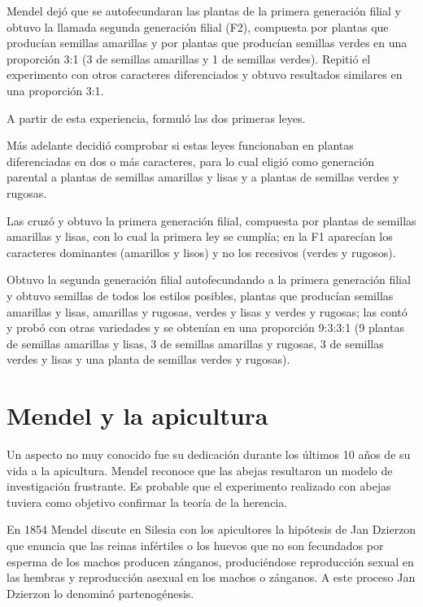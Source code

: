 \documentclass[letterpaper,12pt]{report}
\begin{document}
Mendel dejó que se autofecundaran las plantas de la primera generación filial y obtuvo la llamada segunda generación filial (F2), compuesta por plantas que producían semillas amarillas y por plantas que producían semillas verdes en una proporción 3:1 (3 de semillas amarillas y 1 de semillas verdes). Repitió el experimento con otros caracteres diferenciados y obtuvo resultados similares en una proporción 3:1.

A partir de esta experiencia, formuló las dos primeras leyes.

Más adelante decidió comprobar si estas leyes funcionaban en plantas diferenciadas en dos o más caracteres, para lo cual eligió como generación parental a plantas de semillas amarillas y lisas y a plantas de semillas verdes y rugosas.

Las cruzó y obtuvo la primera generación filial, compuesta por plantas de semillas amarillas y lisas, con lo cual la primera ley se cumplía; en la F1 aparecían los caracteres dominantes (amarillos y lisos) y no los recesivos (verdes y rugosos).

Obtuvo la segunda generación filial autofecundando a la primera generación filial y obtuvo semillas de todos los estilos posibles, plantas que producían semillas amarillas y lisas, amarillas y rugosas, verdes y lisas y verdes y rugosas; las contó y probó con otras variedades y se obtenían en una proporción 9:3:3:1 (9 plantas de semillas amarillas y lisas, 3 de semillas amarillas y rugosas, 3 de semillas verdes y lisas y una planta de semillas verdes y rugosas).

\chapter{Mendel y la apicultura}

\thispagestyle{empty}

Un aspecto no muy conocido fue su dedicación durante los últimos 10 años de su vida a la apicultura. Mendel reconoce que las abejas resultaron un modelo de investigación frustrante. Es probable que el experimento realizado con abejas tuviera como objetivo confirmar la teoría de la herencia.

En 1854 Mendel discute en Silesia con los apicultores la hipótesis de Jan Dzierzon que enuncia que las reinas infértiles o los huevos que no son fecundados por esperma de los machos producen zánganos, produciéndose reproducción sexual en las hembras y reproducción asexual en los machos o zánganos. A este proceso Jan Dzierzon lo denominó partenogénesis.
\end{document}
